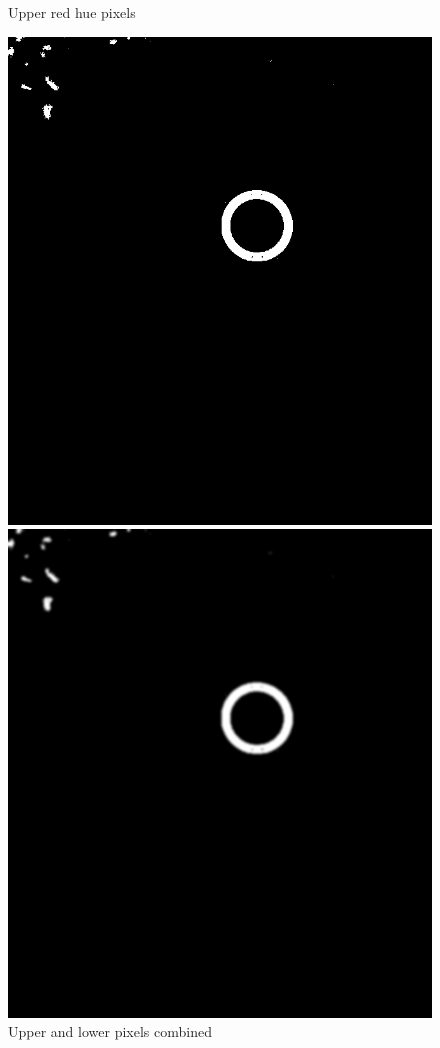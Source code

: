 \begin{figure}[H]
	\caption{Upper red hue pixels}\label{fig:upper_red}
	\endminipage\hfill
	\newline
	\newline
	\includegraphics[width=\linewidth]{images/redcombined1.png}
	\caption{Upper and lower pixels combined}\label{fig:combined}
	\endminipage\hfill
	\includegraphics[width=\linewidth]{images/redcombined2.png}

\end{figure}
